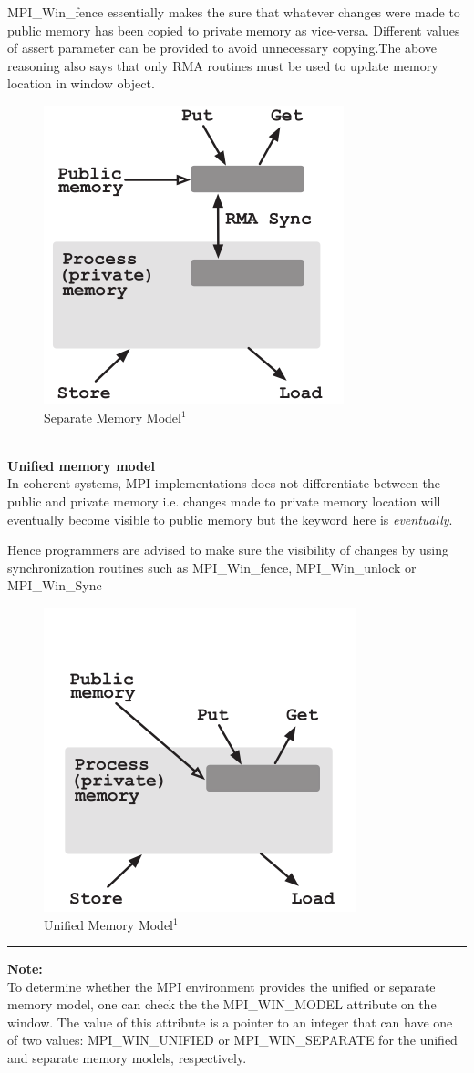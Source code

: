 {\ttfamily MPI\_Win\_fence} essentially makes the sure that whatever changes were made to public memory has been copied to private memory as vice-versa. Different values of assert parameter can be provided to avoid unnecessary copying.The above reasoning also says that only RMA routines must be used to update memory location in window object.
\begin{figure}[!ht]
    \centering
    \includegraphics[width=0.35\linewidth]{attachments/sep_mem_model.png}
    \caption{Separate Memory Model$^1$}
\end{figure}\\
\vspace{3pt} \hspace{-11pt}
\textbf{Unified memory model}\\
In coherent systems, MPI implementations does not differentiate between the public and private memory i.e. changes made to private memory location will eventually become visible to public memory but the keyword here is {\em eventually}.

Hence programmers are advised to make sure the visibility of changes by using synchronization routines such as {\ttfamily MPI\_Win\_fence}, {\ttfamily MPI\_Win\_unlock} or {\ttfamily MPI\_Win\_Sync}
\begin{figure}[!ht]
    \centering
    \includegraphics[width=0.37\linewidth]{attachments/uni_mem_model.png}
    \caption{Unified Memory Model$^1$}
\end{figure}
\hrule \vspace{5pt} \hspace{-21pt}
\textbf{Note:}\\
To determine whether the MPI environment provides the uniﬁed or separate memory model, one can check the the MPI\_WIN\_MODEL attribute on the window. The value of this attribute is a pointer to an integer that can have one of two values: MPI\_WIN\_UNIFIED or MPI\_WIN\_SEPARATE for the uniﬁed and separate memory models, respectively.


